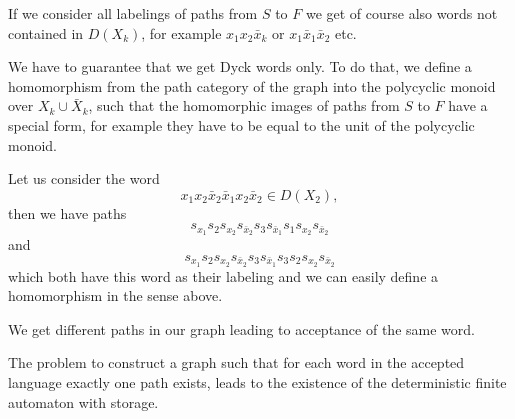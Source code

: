 \begin{center}
\end{center}

If we consider all labelings of paths from $S$ to $F$ we get of course also
words not contained in $D(X_k)$, for example $x_1 x_2 \bar{x}_k$ or $x_1
\bar{x}_1 \bar{x}_2$ etc.

We have to guarantee that we get Dyck words only. To do that, we define a
homomorphism from the path category of the graph into the polycyclic monoid over
$X_k \cup \bar{X}_k$, such that the homomorphic images of paths from $S$ to
$F$ have a special form, for example they have to be equal to the unit of the
polycyclic monoid.

Let us consider the word
\[ x_1 x_2 \bar{x}_2 \bar{x}_1 x_2 \bar{x}_2 \in D(X_2), \]
then we have paths
\[s_{x_1} s_2 s_{x_2} s_{\bar{x}_2} s_3 s_{\bar{x}_1} s_1
s_{x_2} s_{\bar{x}_2} \] 
and 
\[s_{x_1} s_2 s_{x_2} s_{\bar{x}_2} s_3
s_{\bar{x}_1} s_3 s_2 s_{x_2} s_{\bar{x}_2}\]
which both have this word as their labeling and we can easily define a
homomorphism in the sense above.

We get different paths in our graph leading to acceptance of the same word.

The problem to construct a graph such that for each word in the accepted
language exactly one path exists, leads to the existence of the deterministic
finite automaton with storage.
